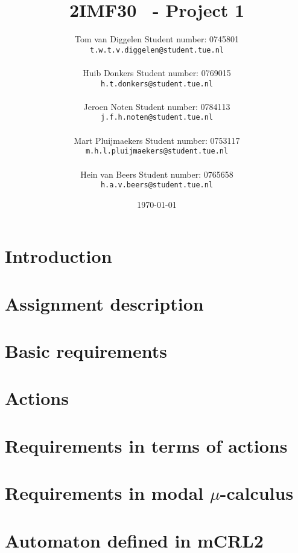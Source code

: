 \documentclass[a4paper,twoside,11pt]{article}
\title{\sffamily\bfseries 2IMF30 \scg\ - Project 1}
\author{Tom van Diggelen \qquad Student number: 0745801 \\{\tt t.w.t.v.diggelen@student.tue.nl}\\ \\ Huib Donkers \qquad Student number: 0769015 \\{\tt h.t.donkers@student.tue.nl} \\ \\ Jeroen Noten \qquad Student number: 0784113 \\{\tt j.f.h.noten@student.tue.nl}\\ \\ Mart Pluijmaekers \qquad Student number: 0753117 \\{\tt m.h.l.pluijmaekers@student.tue.nl} \\ \\ Hein van Beers \qquad Student number: 0765658 \\{\tt h.a.v.beers@student.tue.nl}}
\date{\today}
\begin{document}
\maketitle
\tableofcontents

\newpage
\section{Introduction}


\section{Assignment description}


\section{Basic requirements}



\section{Actions}


\section{Requirements in terms of actions}


\section{Requirements in modal $\mu$-calculus}


\section{Automaton defined in mCRL2}


\begin{thebibliography}{9}

\end{thebibliography}
\end{document}
